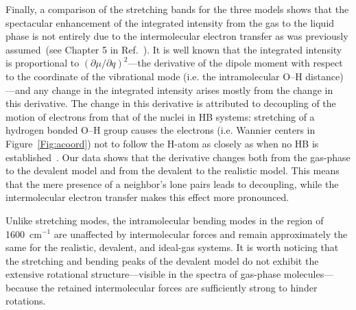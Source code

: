 \documentclass[aps,prl,reprint,amsmath,amssymb]{revtex4-1}
\begin{document}

Finally, a comparison of the stretching bands for the three models shows that the spectacular enhancement of the integrated intensity from the gas to the liquid phase is not entirely due to the intermolecular electron transfer as was previously assumed~(see Chapter 5 in Ref.~). 
It is well known that the integrated intensity is proportional to $\left({\partial \mu}/{\partial q}\right)^2$---the derivative of the dipole moment with respect to the coordinate of the vibrational mode (i.e. the intramolecular O--H distance)---and any change in the integrated intensity arises mostly from the change in this derivative. 
The change in this derivative is attributed to decoupling of the motion of electrons from that of the nuclei in HB systems: stretching of a hydrogen bonded O--H group causes the electrons (i.e. Wannier centers in Figure~\ref{Fig:acoord}) not to follow the H-atom as closely as when no HB is established~\cite{marechal2006hydrogen}. 
Our data shows that the derivative changes both from the gas-phase to the devalent model and from the devalent to the realistic model. 
This means that the mere presence of a neighbor's lone pairs leads to decoupling, while the intermolecular electron transfer makes this effect more pronounced.


Unlike stretching modes, the intramolecular bending modes in the region of 1600~cm$^{-1}$ are unaffected by intermolecular forces and remain approximately the same for the realistic, devalent, and ideal-gas systems. 
It is worth noticing that the stretching and bending peaks of the devalent model do not exhibit the extensive rotational structure---visible in the spectra of gas-phase molecules---because the retained intermolecular forces are sufficiently strong to hinder rotations.
\end{document}
